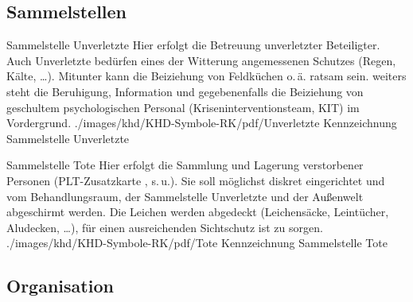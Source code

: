 % 
% 
% 
% 






\subsection{Sammelstellen}


\TextSlideTeaser
{Sammelstelle Unverletzte}%
{%
Hier erfolgt die Betreuung unverletzter Beteiligter. 
Auch Unverletzte bedürfen eines der Witterung angemessenen
Schutzes (Regen, Kälte, \ldots). Mitunter kann die
Beiziehung von Feldküchen o.\,ä. ratsam sein. weiters steht
die Beruhigung, Information und gegebenenfalls die
Beiziehung von geschultem psychologischen Personal
(Kriseninterventionsteam, KIT) im Vordergrund.}%
{\SymbolText}%
{./images/khd/KHD-Symbole-RK/pdf/Unverletzte}%
{}%
{Kennzeichnung Sammelstelle Unverletzte}%
{}%
{}%



\TextSlideTeaser
{Sammelstelle Tote}%
{%
 Hier erfolgt die Sammlung und Lagerung verstorbener Personen
 (PLT-Zusatzkarte {}, s.\,u.). 
 Sie soll möglichst diskret eingerichtet 
 und vom Behandlungsraum, der Sammelstelle Unverletzte und der
 Außenwelt abgeschirmt werden.  
 Die Leichen werden abgedeckt (Leichensäcke, Leintücher, Aludecken, \ldots), 
 für einen ausreichenden Sichtschutz ist zu sorgen.}%
{\SymbolText}%
{./images/khd/KHD-Symbole-RK/pdf/Tote}%
{Kennzeichnung Sammelstelle Tote}%
{}%
{}%
{}%




\subsection{Organisation}
\label{topic:khd-organisation}


